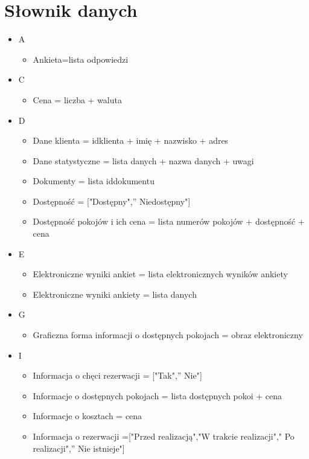 \documentclass[a4paper, 11pt]{article}
\begin{document}
	
	
	
	\section{Słownik danych}	
	\begin{itemize}
		\item A
		\begin{itemize}
			\item Ankieta=lista odpowiedzi
		\end{itemize}
		\item C
		\begin{itemize}
			\item Cena = liczba + waluta
		\end{itemize}
		\item D
		\begin{itemize}
			\item Dane klienta = idklienta + imię + nazwisko + adres
			\item Dane statystyczne = lista danych + nazwa danych + uwagi
			\item Dokumenty = lista iddokumentu
			\item Dostępność = ["Dostępny",'' Niedostępny"]
			\item Dostępność pokojów i ich cena = lista numerów pokojów + dostępność + cena
		\end{itemize}
		\item E
		\begin{itemize}
			\item Elektroniczne wyniki ankiet = lista elektronicznych wyników ankiety
			\item Elektroniczne wyniki ankiety = lista danych
		\end{itemize}
		\item G
		\begin{itemize}
			\item Graficzna forma informacji o dostępnych pokojach = obraz elektroniczny
		\end{itemize}
		\item I
		\begin{itemize}
			\item Informacja o chęci rezerwacji = ["Tak",'' Nie"]
			\item Informacje o dostępnych pokojach = lista dostępnych pokoi + cena
			\item Informacje o kosztach = cena
			\item Informacja o rezerwacji =["Przed realizacją","W trakcie realizacji"," Po realizacji",'' Nie istnieje"]				

\end{itemize}
\end{itemize}
\end{document}
